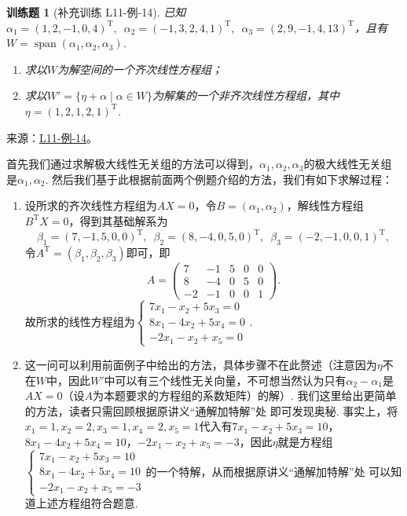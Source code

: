 \documentclass[12pt,fontset=fandol]{ctexart}
\newtheorem{exercise}{训练题}[section]
\begin{document}
\begin{exercise}[补充训练 L11-例-14]\label{prob:L11-例-14}
已知$\alpha_1=(1,2,-1,0,4)^\mathrm{T},\enspace\alpha_2=(-1,3,2,4,1)^\mathrm{T},\enspace\alpha_3=(2,9,-1,4,13)^\mathrm{T}$，且有$W=\operatorname{span}(\alpha_1,\alpha_2,\alpha_3)$.
    \begin{enumerate}
        \item 求以$W$为解空间的一个齐次线性方程组；

        \item 求以$W'=\{\eta+\alpha \mid \alpha\in W\}$为解集的一个非齐次线性方程组，其中$\eta=(1,2,1,2,1)^\mathrm{T}$.
    \end{enumerate}
\end{exercise}
\noindent 来源：\href{https://github.com/yhwu-is/Linear-Algebra-Left-Undone/blob/new/%E8%AE%B2%E4%B9%89/%E4%B8%93%E9%A2%98/11%20%E6%9C%9D%E8%8A%B1%E5%A4%95%E6%8B%BE.tex}{L11-例-14}。
\begin{solve}
首先我们通过求解极大线性无关组的方法可以得到，$\alpha_1,\alpha_2,\alpha_3$的极大线性无关组是$\alpha_1,\alpha_2$. 然后我们基于此根据前面两个例题介绍的方法，我们有如下求解过程：
    \begin{enumerate}
        \item 设所求的齐次线性方程组为$AX=0$，令$B=(\alpha_1,\alpha_2)$，解线性方程组$B^\mathrm{T}X=0$，得到其基础解系为
              \[\beta_1=(7,-1,5,0,0)^\mathrm{T},\enspace\beta_2=(8,-4,0,5,0)^\mathrm{T},\enspace\beta_3=(-2,-1,0,0,1)^\mathrm{T},\]
              令$A^\mathrm{T}=(\beta_1,\beta_2,\beta_3)$即可，即
              \[A=\begin{pmatrix}
                      7 & -1 & 5 & 0 & 0 \\ 8 & -4 & 0 & 5 & 0 \\ -2 & -1 & 0 & 0 & 1
                  \end{pmatrix}.\]
              故所求的线性方程组为$\begin{cases}
                      7x_1-x_2+5x_3=0 \\ 8x_1-4x_2+5x_4=0 \\ -2x_1-x_2+x_5=0
                  \end{cases}$.

        \item 这一问可以利用前面例子中给出的方法，具体步骤不在此赘述（注意因为$\eta$不在$W$中，因此$W'$中可以有三个线性无关向量，不可想当然认为只有$\alpha_2-\alpha_1$是$AX=0$（设$A$为本题要求的方程组的系数矩阵）的解）. 我们这里给出更简单的方法，读者只需回顾根据原讲义“通解加特解”处 即可发现奥秘. 事实上，将$x_1=1,x_2=2,x_3=1,x_4=2,x_5=1$代入有$7x_1-x_2+5x_3=10$，$8x_1-4x_2+5x_4=10$，$-2x_1-x_2+x_5=-3$，因此$\eta$就是方程组$\begin{cases}
                      7x_1-x_2+5x_3=10 \\ 8x_1-4x_2+5x_4=10 \\ -2x_1-x_2+x_5=-3
                  \end{cases}$的一个特解，从而根据原讲义“通解加特解”处 可以知道上述方程组符合题意.
    \end{enumerate}
\end{solve}
\end{document}
